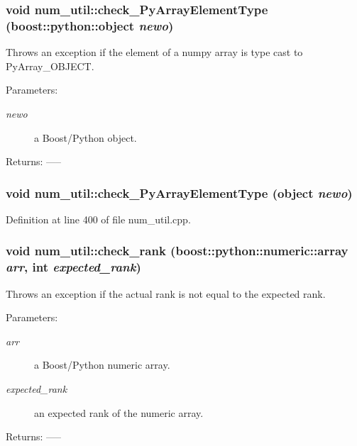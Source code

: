 \subsubsection{\setlength{\rightskip}{0pt plus 5cm}void num\_\-util::check\_\-Py\-Array\-Element\-Type (boost::python::object {\em newo})}\label{namespacenum__util_a75}


Throws an exception if the element of a numpy array is type cast to Py\-Array\_\-OBJECT. \begin{Desc}
\item[Parameters:]
\begin{description}
\item[{\em newo}]a Boost/Python object. \end{description}
\end{Desc}
\begin{Desc}
\item[Returns:]-----\end{Desc}
\subsubsection{\setlength{\rightskip}{0pt plus 5cm}void num\_\-util::check\_\-Py\-Array\-Element\-Type (object {\em newo})}\label{namespacenum__util_a54}




Definition at line 400 of file num\_\-util.cpp.
\subsubsection{\setlength{\rightskip}{0pt plus 5cm}void num\_\-util::check\_\-rank (boost::python::numeric::array {\em arr}, int {\em expected\_\-rank})}\label{namespacenum__util_a39}


Throws an exception if the actual rank is not equal to the expected rank. \begin{Desc}
\item[Parameters:]
\begin{description}
\item[{\em arr}]a Boost/Python numeric array. \item[{\em expected\_\-rank}]an expected rank of the numeric array. \end{description}
\end{Desc}
\begin{Desc}
\item[Returns:]-----\end{Desc}


